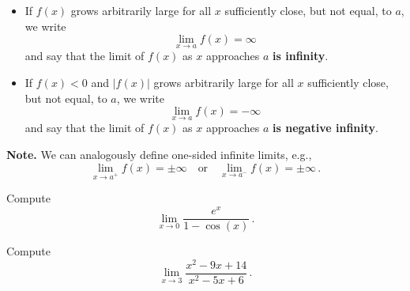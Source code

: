 \documentclass[10pt,t,presentation,ignorenonframetext,aspectratio=169]{beamer}
\begin{document}
\begin{frame}
  \vs
  \begin{defn}
    \begin{itemize}
    \item If $f(x)$ grows arbitrarily large for all $x$ sufficiently
      close, but not equal, to $a$, we write
      \[
        \lim_{x \to a} f(x) = \infty
      \]
      and say that the limit of $f(x)$ as $x$ approaches $a$
      \textbf{is infinity}.
    \item If $f(x) < 0$ and $\left| f(x) \right|$ grows arbitrarily
      large for all $x$ sufficiently close, but not equal, to $a$, we
      write
      \[
        \lim_{x \to a} f(x) = -\infty
      \]
      and say that the limit of $f(x)$ as $x$ approaches $a$
      \textbf{is negative infinity}.
    \end{itemize}
  \end{defn}

  \vspace{1.5ex}
  \textbf{Note.} We can analogously define one-sided infinite limits, e.g.,
  \[
    \lim_{x \to a^+} f(x) = \pm \infty
    \quad \text{or} \quad
    \lim_{x \to a^-} f(x) = \pm \infty \,.
  \]
\end{frame}

\begin{frame}
  \vs
  \question{} Compute
  \[
    \lim_{x \to 0} \frac{ e^x }{ 1-\cos(x) } \,.
  \]
\end{frame}

\begin{frame}
  \vs
  \question{} Compute
  \[
    \lim_{x \to 3} \frac{ x^2-9x+14 }{ x^2-5x+6 } \,.
  \]
\end{frame}
\end{document}

